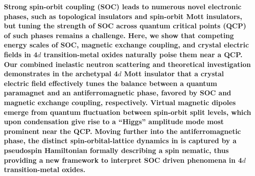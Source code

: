 \maketitle
\noindent
{\bf 
Strong spin-orbit coupling (SOC) leads to numerous novel electronic phases, such as topological insulators and spin-orbit Mott insulators, but tuning the strength of SOC across quantum critical points (QCP) of such phases remains a challenge. Here, we show that competing energy scales of SOC, magnetic exchange coupling, and crystal electric fields in 4$d$ transition-metal oxides naturally poise them near a QCP. Our combined inelastic neutron scattering and theoretical investigation demonstrates in the archetypal 4$d$ Mott insulator \CRO that a crystal electric field effectively tunes the balance between a quantum paramagnet and an antiferromagnetic phase, favored by SOC and magnetic exchange coupling, respectively. Virtual magnetic dipoles emerge from quantum fluctuation between spin-orbit split levels, which upon condensation give rise to a ``Higgs'' amplitude mode most prominent near the QCP. Moving further into the antiferromagnetic phase, the distinct spin-orbital-lattice dynamics in \CRO is captured by a pseudospin Hamiltonian formally describing a spin nematic, thus providing a new framework to interpret SOC driven phenomena in 4$d$ transition-metal oxides.
}